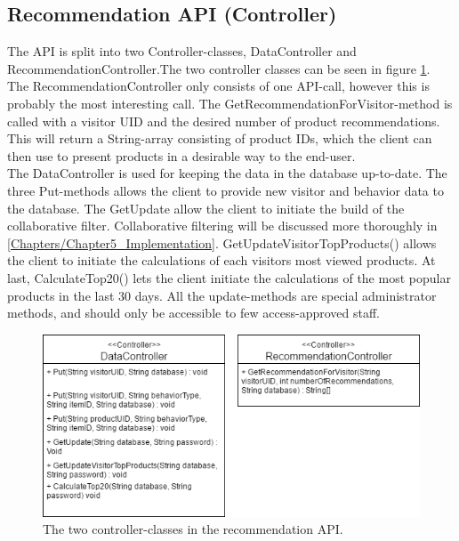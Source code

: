 \subsection{Recommendation API (Controller)}
The API is split into two Controller-classes, DataController and RecommendationController.The two controller classes can be seen in figure \ref{fig:ControllerClasses}. The RecommendationController only consists of one API-call, however this is probably the most interesting call. The GetRecommendationForVisitor-method is called with a visitor UID and the desired number of product recommendations. This will return a String-array consisting of product IDs, which the client can then use to present products in a desirable way to the end-user.\\
The DataController is used for keeping the data in the database up-to-date. The three Put-methods allows the client to provide new visitor and behavior data to the database. The GetUpdate allow the client to initiate the build of the collaborative filter. Collaborative filtering will be discussed more thoroughly in \ref{Chapters/Chapter5_Implementation}. GetUpdateVisitorTopProducts() allows the client to initiate the calculations of each visitors most viewed products. At last, CalculateTop20() lets the client initiate the calculations of the most popular products in the last 30 days. All the update-methods are special administrator methods, and should only be accessible to few access-approved staff.

\begin{figure}
	\centering
	\includegraphics[width=.6\linewidth]{Figures/ControllerClasses.png}
	\caption{The two controller-classes in the recommendation API.}
	\label{fig:ControllerClasses}
\end{figure}

